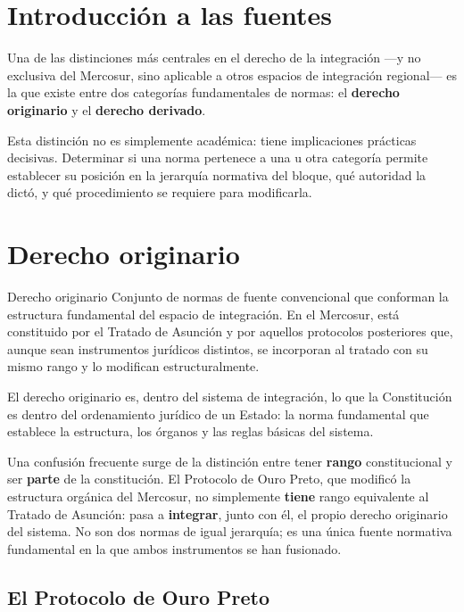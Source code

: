 \documentclass[12pt,oneside]{book}
\begin{document}
\section{Introducción a las fuentes}

Una de las distinciones más centrales en el derecho de la integración —y no exclusiva del Mercosur, sino aplicable a otros espacios de integración regional— es la que existe entre dos categorías fundamentales de normas: el \textbf{derecho originario} y el \textbf{derecho derivado}.

Esta distinción no es simplemente académica: tiene implicaciones prácticas decisivas. Determinar si una norma pertenece a una u otra categoría permite establecer su posición en la jerarquía normativa del bloque, qué autoridad la dictó, y qué procedimiento se requiere para modificarla.

\section{Derecho originario}

\begin{definition}{Derecho originario}
Conjunto de normas de fuente convencional que conforman la estructura fundamental del espacio de integración. En el Mercosur, está constituido por el Tratado de Asunción y por aquellos protocolos posteriores que, aunque sean instrumentos jurídicos distintos, se incorporan al tratado con su mismo rango y lo modifican estructuralmente.
\end{definition}

El derecho originario es, dentro del sistema de integración, lo que la Constitución es dentro del ordenamiento jurídico de un Estado: la norma fundamental que establece la estructura, los órganos y las reglas básicas del sistema.

Una confusión frecuente surge de la distinción entre tener \textbf{rango} constitucional y ser \textbf{parte} de la constitución. El Protocolo de Ouro Preto, que modificó la estructura orgánica del Mercosur, no simplemente \textbf{tiene} rango equivalente al Tratado de Asunción: pasa a \textbf{integrar}, junto con él, el propio derecho originario del sistema. No son dos normas de igual jerarquía; es una única fuente normativa fundamental en la que ambos instrumentos se han fusionado.

\subsection{El Protocolo de Ouro Preto}
\end{document}
